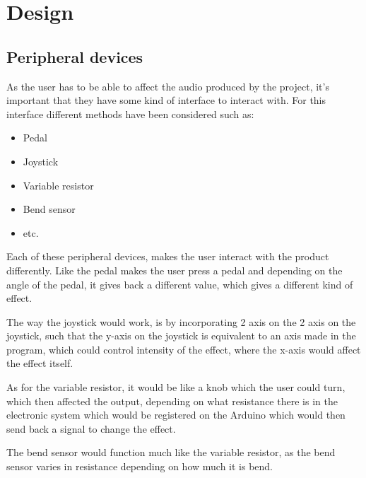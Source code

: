 \chapter{Design}\label{ch:design}

\section{Peripheral devices}
As the user has to be able to affect the audio produced by the project, it's important that they have some kind of interface to interact with. For this interface different methods have been considered such as:

\begin{itemize}
\item Pedal
\item Joystick
\item Variable resistor
\item Bend sensor
\item etc.
\end{itemize}

Each of these peripheral devices, makes the user interact with the product differently. Like the pedal makes the user press a pedal and depending on the angle of the pedal, it gives back a different value, which gives a different kind of effect.

The way the joystick would work, is by incorporating 2 axis on the 2 axis on the joystick, such that the y-axis on the joystick is equivalent to an axis made in the program, which could control intensity of the effect, where the x-axis would affect the effect itself. 

As for the variable resistor, it would be like a knob which the user could turn, which then affected the output, depending on what resistance there is in the electronic system which would be registered on the Arduino which would then send back a signal to change the effect. 

The bend sensor would function much like the variable resistor, as the bend sensor varies in resistance depending on how much it is bend.
